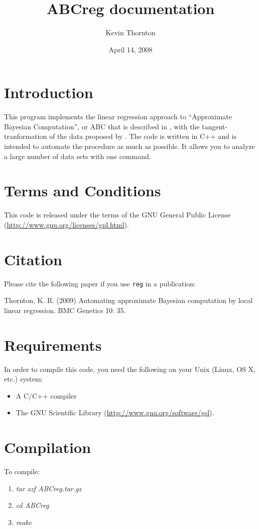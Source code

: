 \documentclass{article}
\title{ABCreg documentation}
\author{Kevin Thornton}
\date{April 14, 2008}
\begin{document}
\maketitle

\section*{Introduction}
This program implements the linear regression approach to ``Approximate Bayesian Computation'', or ABC that is described in \cite{beaumont02ABC}, with the tangent-tranformation of the data proposed by \cite{hamilton.abc.2005}.  The code is written in C++ and is intended to automate the procedure as much as possible.  It allows you to analyze a large number of data sets with one command.

\section*{Terms and Conditions}
This code is released under the terms of the GNU General Public License (\url{http://www.gnu.org/licenses/gpl.html}).

\section*{Citation}
Please cite the following paper if you use \texttt{reg} in a publication:

Thornton, K. R. (2009) Automating approximate Bayesian computation by local linear regression. BMC Genetics 10: 35.
\section*{Requirements}
In order to compile this code, you need the following on your Unix (Linux, OS X, etc.) system:
\begin{itemize}
\item A C/C++ compiler
\item The GNU Scientific Library (\url{http://www.gnu.org/software/gsl}).
\end{itemize}

\section*{Compilation}
To compile:
\begin{enumerate}
\item \textit{tar xzf ABCreg.tar.gz}
\item \textit{cd ABCreg}
\item \textit{make}
\end{enumerate}
\end{document}
